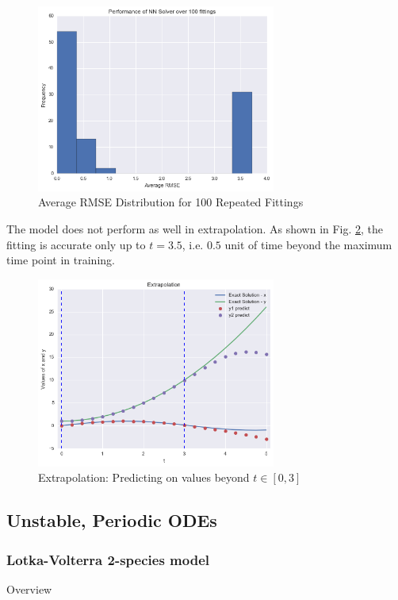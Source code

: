 \documentclass[11pt]{article}
\begin{document}
\begin{figure}
\centering
\includegraphics[width=0.7\textwidth]{histogram_simple.png}
      \caption{Average RMSE Distribution for 100 Repeated Fittings \label{fig:SimpleHistogram}}
\end{figure}

The model does not perform as well in extrapolation. As shown in Fig. \ref{fig:SimpleExtrap}, the fitting is accurate only up to $t = 3.5$, i.e. $0.5$ unit of time beyond the maximum time point in training. 

\begin{figure}
\centering
\includegraphics[width=0.7\textwidth]{extrapo_simple.png}
      \caption{Extrapolation: Predicting on values beyond $t\in [0, 3]$ \label{fig:SimpleExtrap}}
\end{figure}


\subsection{Unstable, Periodic ODEs}


\subsubsection{Lotka-Volterra 2-species model}
Overview
\break
\end{document}
